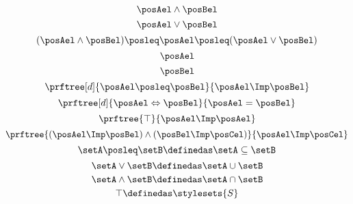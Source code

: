 {\begin{forslides}
\begin{equation*}
\end{equation*}
    \begin{equation*}
        \label{eq:latt_1}
        \posAel \wedge \posBel
\end{equation*}
        \begin{equation*}
        \label{eq:latt_2}
        \posAel \vee \posBel
\end{equation*}
            \begin{equation*}
        \label{eq:latt_3}
        (\posAel \wedge \posBel)\posleq \posAel \posleq (\posAel \vee \posBel)
\end{equation*}
        \begin{equation*}
        \label{eq:latt_4}
        \posAel
\end{equation*}
        \begin{equation*}
        \label{eq:latt_5}
        \posBel
\end{equation*}
    \begin{equation*}
        \label{eq:prop_1}
        \prftree[d]{\posAel \posleq \posBel}{\posAel \Imp \posBel}
\end{equation*}
        \begin{equation*}
        \label{eq:prop_2}
        \prftree[d]{\posAel \Leftrightarrow \posBel}{\posAel = \posBel}
\end{equation*}
        \begin{equation*}
        \label{eq:prop_3}
        \prftree{\top}{\posAel \Imp \posAel}
\end{equation*}
        \begin{equation*}
        \label{eq:prop_4}
        \prftree{(\posAel \Imp \posBel)\wedge (\posBel \Imp \posCel)}{\posAel \Imp \posCel}
\end{equation*}
    \begin{equation*}
        \label{eq:pow_1}
        \setA \posleq \setB \definedas \setA \subseteq \setB
\end{equation*}
        \begin{equation*}
        \label{eq:pow_2}
        \setA \vee \setB \definedas \setA \cup \setB
\end{equation*}
            \begin{equation*}
        \label{eq:pow_3}
        \setA \wedge \setB \definedas \setA \cap \setB
\end{equation*}
            \begin{equation*}
        \label{eq:pow_4}
        \top \definedas \stylesets{S}

\end{equation*}
\end{forslides}}
